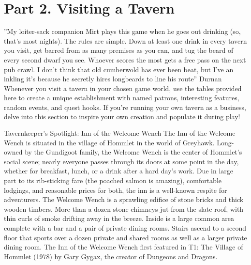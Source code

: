 \documentclass[10pt,a4paper,twoside,twocolumn,openany,bg=print,nodeprecatedcode]{dndbook}
\begin{document}
\chapter{Part 2. Visiting a Tavern}
\DndQuote%
{}
{''My loiter-sack companion Mirt plays this game when he goes out drinking (so, that's most nights). The rules are simple. Down at least one drink in every tavern you visit, get barred from as many premises as you can, and tug the beard of every second dwarf you see. Whoever scores the most gets a free pass on the next pub crawl. I don't think that old cumberwold has ever been beat, but I've an inkling it's because he secretly hires longbeards to line his route''}
{Durnan}
Whenever you visit a tavern in your chosen game world, use the tables provided here to create a unique establishment with named patrons, interesting features, random events, and quest hooks. If you're running your own tavern as a business, delve into this section to inspire your own creation and populate it during play!
\begin{DndComment}{Tavernkeeper's Spotlight: Inn of the Welcome Wench}
The Inn of the Welcome Wench is situated in the village of Hommlet in the world of Greyhawk. Long-owned by the Gundigoot family, the Welcome Wench is the center of Hommlet's social scene; nearly everyone passes through its doors at some point in the day, whether for breakfast, lunch, or a drink after a hard day's work. Due in large part to its rib-sticking fare (the poached salmon is amazing), comfortable lodgings, and reasonable prices for both, the inn is a well-known respite for adventurers.
The Welcome Wench is a sprawling edifice of stone bricks and thick wooden timbers. More than a dozen stone chimneys jut from the slate roof, with thin curls of smoke drifting away in the breeze. Inside is a large common area complete with a bar and a pair of private dining rooms. Stairs ascend to a second floor that sports over a dozen private and shared rooms as well as a larger private dining room.
The Inn of the Welcome Wench first featured in T1: The Village of Hommlet (1978) by Gary Gygax, the creator of Dungeons and Dragons.
\end{DndComment}
\end{document}
